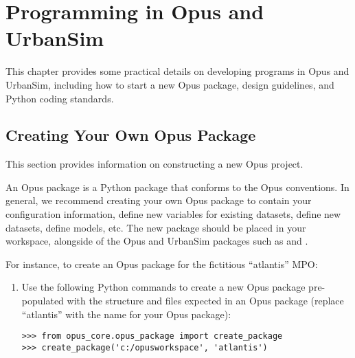 

\chapter{Programming in Opus and UrbanSim}
\label{chapter:programming}

This chapter provides some practical details on developing programs in Opus
and UrbanSim, including how to start a new Opus package, design guidelines,
and Python coding standards.

\section{Creating Your Own Opus Package}
\label{sec:create-opus-package}

This section provides information on constructing a new Opus project.

An Opus package is a Python package \pythonpackagesindex that conforms to the
Opus conventions.  In general, we recommend creating your own Opus package
to contain your configuration information, define new variables for existing
datasets, define new datasets, define models, etc.  The new package should be 
placed in your workspace, alongside of the Opus and UrbanSim packages such as 
 and .

For instance, to create an
Opus package for the fictitious ``atlantis'' MPO:

\begin{enumerate}
  \item Use the following Python commands to create a new  Opus
  package pre-populated with the structure and files expected in an Opus package
  (replace ``atlantis'' with the name for your Opus package):
\begin{verbatim}
>>> from opus_core.opus_package import create_package
>>> create_package('c:/opusworkspace', 'atlantis')
\end{verbatim}
\end{enumerate}

